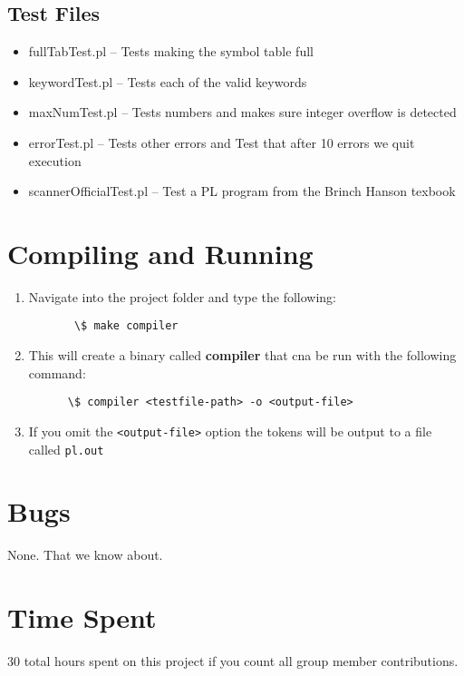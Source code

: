 \documentclass{article}
\begin{document}
\subsection{Test Files}
\begin{itemize}
  \item fullTabTest.pl -- Tests making the symbol table full
  \item keywordTest.pl -- Tests each of the valid keywords
  \item maxNumTest.pl -- Tests numbers and makes sure integer overflow is detected
  \item errorTest.pl -- Tests other errors and Test that after 10 errors we quit execution
  \item scannerOfficialTest.pl -- Test a PL program from the Brinch Hanson texbook
\end{itemize}

\section{Compiling and Running}

\begin{enumerate}
  \item Navigate into the project folder and type the following:

\verb|       \$ make compiler|

  \item This will create a binary called \textbf{compiler} that cna be run with the following command:

\verb|      \$ compiler <testfile-path> -o <output-file>|

  \item If you omit the \verb|<output-file>| option the tokens will be output to a file called \verb|pl.out|
\end{enumerate}

\section{Bugs}
None. That we know about.

\section{Time Spent}
30 total hours spent on this project if you count all group member contributions.
\end{document}
